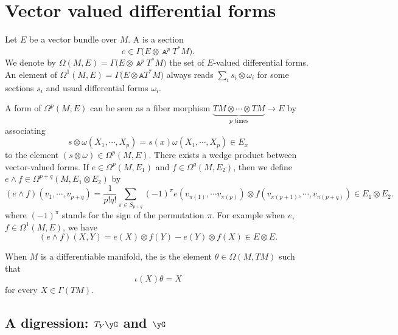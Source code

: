 			\section{Vector valued differential forms}	\label{SecVectValFiffFor}

			Let $E$ be a vector bundle over $M$. A  is a section
			\[
				e\in\Gamma\big( E\otimes\Wedge^pT^*M \big).
				\]
				We denote by $\Omega(M,E)=\Gamma\big( E\otimes\Wedge^pT^*M \big)$ the set of $E$-valued differential forms. An element of $\Omega^1(M,E)=\Gamma\big( E\otimes\Wedge T^*M\big)$ always reads  $\sum_is_i\otimes\omega_i$ for some sections $s_i$ and usual differential forms $\omega_i$.

				A form of $\Omega^p(M,E)$ can be seen as a fiber morphism $\underbrace{TM\otimes\cdots\otimes TM}_{p\text{ times}}\to E$ by associating
				\[
					s\otimes\omega(X_1,\cdots,X_p)=s(x)\omega(X_1,\cdots,X_p)\in E_x
					\]
					to the element $(s\otimes \omega)\in\Omega^p(M,E)$. There exists a wedge product between vector-valued forms. If $e\in\Omega^p(M,E_1)$ and $f\in\Omega^q(M,E_2)$, then we define $e\wedge f\in\Omega^{p+q}(M,E_1\otimes E_2)$ by
					\begin{equation}	\label{EqDefwedgevecor}
					(e\wedge f)(v_1,\cdots,v_{p+q})=\frac{1}{ p!q! }\sum_{\pi\in S_{p+q}}(-1)^{\pi} e(v_{\pi(1)},\cdots v_{\pi(p)})\otimes f(v_{\pi(p+1)},\cdots,v_{\pi(p+q)})\in E_1\otimes E_2.
					\end{equation}
					where $(-1)^{\pi}$ stands for the sign of the permutation $\pi$. For example when $e$, $f\in \Omega^1(M,E)$, we have
					\[
						(e\wedge f)(X,Y)=e(X)\otimes f(Y)-e(Y)\otimes f(X)\in E\otimes E.
						\]

						When $M$ is a differentiable manifold, the  is the element $\theta\in\Omega(M,TM)$ such that
						\[
							\iota(X)\theta=X
							\]
							for every $X\in \Gamma(TM)$.

							\subsection{A digression:  \texorpdfstring{$T_Y\yG$}{TYG} and \texorpdfstring{$\yG$}{G}}\label{subsec:digress}


